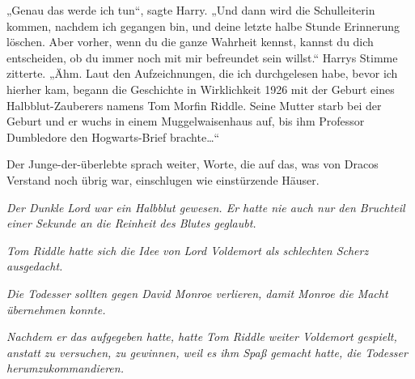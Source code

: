 „Genau das werde ich tun“, sagte Harry. „Und dann wird die Schulleiterin kommen, nachdem ich gegangen bin, und deine letzte halbe Stunde Erinnerung löschen. Aber vorher, wenn du die ganze Wahrheit kennst, kannst du dich entscheiden, ob du immer noch mit mir befreundet sein willst.“
Harrys Stimme zitterte.
„Ähm. Laut den Aufzeichnungen, die ich durchgelesen habe, bevor ich hierher kam, begann die Geschichte in Wirklichkeit 1926 mit der Geburt eines Halbblut-Zauberers namens Tom Morfin Riddle. Seine Mutter starb bei der Geburt und er wuchs in einem Muggelwaisenhaus auf, bis ihm Professor Dumbledore den Hogwarts-Brief brachte…“

Der Junge-der-überlebte sprach weiter, Worte, die auf das, was von Dracos Verstand noch übrig war, einschlugen wie einstürzende Häuser.

\emph{Der Dunkle Lord war ein Halbblut gewesen. Er hatte nie auch nur den Bruchteil einer Sekunde an die Reinheit des Blutes geglaubt.}

\emph{Tom Riddle hatte sich die Idee von Lord Voldemort als schlechten Scherz ausgedacht.}

\emph{Die Todesser sollten gegen David Monroe verlieren, damit Monroe die Macht übernehmen konnte.}

\emph{Nachdem er das aufgegeben hatte, hatte Tom Riddle weiter Voldemort gespielt, anstatt zu versuchen, zu gewinnen, weil es ihm Spaß gemacht hatte, die Todesser herumzukommandieren.}

